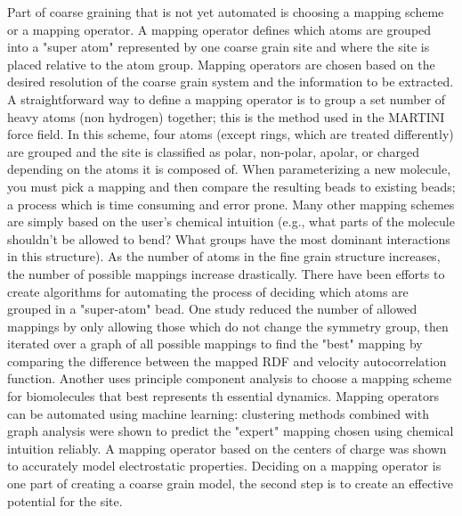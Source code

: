 
Part of coarse graining that is not yet automated is choosing a mapping scheme or a mapping operator.
A mapping operator defines which atoms are grouped into a "super atom" represented by one coarse grain site and where the site is placed relative to the atom group.
Mapping operators are chosen based on the desired resolution of the coarse grain system and the information to be extracted.
A straightforward way to define a mapping operator is to group a set number of heavy atoms (non hydrogen) together; this is the method used in the MARTINI force field\cite{Marrink2007}.
In this scheme, four atoms (except rings, which are treated differently) are grouped and the site is classified as polar, non-polar, apolar, or charged depending on the atoms it is composed of.
When parameterizing a new molecule, you must pick a mapping and then compare the resulting beads to existing beads; a process which is time consuming and error prone\cite{martini-tutorial}.
Many other mapping schemes are simply based on the user's chemical intuition (e.g., what parts of the molecule shouldn't be allowed to bend? What groups have the most dominant interactions in this structure). %
As the number of atoms in the fine grain structure increases, the number of possible mappings increase drastically.
There have been efforts to create algorithms for automating the process of deciding which atoms are grouped in a "super-atom" bead.
One study reduced the number of allowed mappings by only allowing those which do not change the symmetry group, then iterated over a graph of all possible mappings to find the "best" mapping by comparing the difference between the mapped RDF and velocity autocorrelation function\cite{Chakraborty2018b}.
Another uses principle component analysis to choose a mapping scheme for biomolecules that best represents th essential dynamics\cite{Zhang2008}.
Mapping operators can be automated using machine learning: clustering methods combined with graph analysis were shown to predict the "expert" mapping chosen using chemical intuition reliably\cite{Li2020}. 
A mapping operator based on the centers of charge was shown to accurately model electrostatic properties\cite{Cao2015a}.
Deciding on a mapping operator is one part of creating a coarse grain model, the second step is to create an effective potential for the site.

